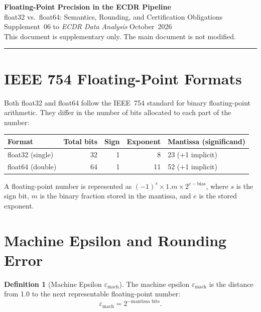 \documentclass[11pt, a4paper]{article}
\theoremstyle{definition}
\newtheorem{definition}{Definition}[section]
\theoremstyle{plain}
\newcommand{\eps}{\varepsilon}
\begin{document}
\begin{center}
  {\LARGE\bfseries\color{teal} Floating-Point Precision in the ECDR Pipeline}\\[0.5em]
  {\large\color{muted} float32 vs.\ float64: Semantics, Rounding, and Certification Obligations}\\[1.2em]
  {\normalsize Supplement~06 to \textit{ECDR Data Analysis} \textbar{} October~2026}\\[0.3em]
  {\small\color{muted} This document is supplementary only. The main document is not modified.}
\end{center}

\vspace{1em}\hrule\vspace{1em}

\tableofcontents
\clearpage

\section{IEEE 754 Floating-Point Formats}

Both float32 and float64 follow the IEEE~754 standard for binary floating-point
arithmetic. They differ in the number of bits allocated to each part of the number:

\begin{center}
\small
\begin{tabular}{@{}lrrrl@{}}
\toprule
Format & Total bits & Sign & Exponent & Mantissa (significand) \\
\midrule
float32 (single) & 32 & 1 & 8 & 23 (+1 implicit) \\
float64 (double) & 64 & 1 & 11 & 52 (+1 implicit) \\
\bottomrule
\end{tabular}
\end{center}

A floating-point number is represented as $(-1)^s \times 1.m \times 2^{e - \text{bias}}$,
where $s$ is the sign bit, $m$ is the binary fraction stored in the mantissa, and
$e$ is the stored exponent.

\section{Machine Epsilon and Rounding Error}

\begin{definition}[Machine Epsilon $\eps_{\text{mach}}$]
  The machine epsilon $\eps_{\text{mach}}$ is the distance from 1.0 to the next
  representable floating-point number:
  \[
    \eps_{\text{mach}} = 2^{-\text{mantissa bits}}.
  \]
\end{definition}
\end{document}
